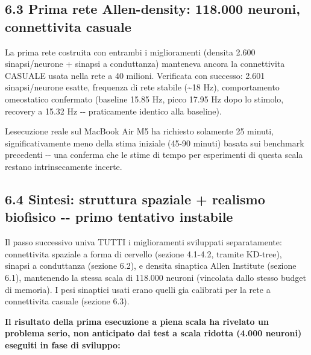 \documentclass[
  italian,
]{article}
\begin{document}
\subsection{6.3 Prima rete Allen-density: 118.000 neuroni, connettivita\textquotesingle{} casuale}\label{prima-rete-allen-density-118.000-neuroni-connettivita-casuale}

La prima rete costruita con entrambi i miglioramenti (densita\textquotesingle{} 2.600 sinapsi/neurone + sinapsi a conduttanza) manteneva ancora la connettivita\textquotesingle{} CASUALE usata nella rete a 40 milioni. Verificata con successo: 2.601 sinapsi/neurone esatte, frequenza di rete stabile (\textasciitilde18 Hz), comportamento omeostatico confermato (baseline 15.85 Hz, picco 17.95 Hz dopo lo stimolo, recovery a 15.32 Hz -\/- praticamente identico alla baseline).

L\textquotesingle esecuzione reale sul MacBook Air M5 ha richiesto solamente 25 minuti, significativamente meno della stima iniziale (45-90 minuti) basata sui benchmark precedenti -\/- una conferma che le stime di tempo per esperimenti di questa scala restano intrinsecamente incerte.

\subsection{6.4 Sintesi: struttura spaziale + realismo biofisico -\/- primo tentativo instabile}\label{sintesi-struttura-spaziale-realismo-biofisico----primo-tentativo-instabile}

Il passo successivo univa TUTTI i miglioramenti sviluppati separatamente: connettivita\textquotesingle{} spaziale a forma di cervello (sezione 4.1-4.2, tramite KD-tree), sinapsi a conduttanza (sezione 6.2), e densita\textquotesingle{} sinaptica Allen Institute (sezione 6.1), mantenendo la stessa scala di 118.000 neuroni (vincolata dallo stesso budget di memoria). I pesi sinaptici usati erano quelli gia\textquotesingle{} calibrati per la rete a connettivita\textquotesingle{} casuale (sezione 6.3).

\textbf{Il risultato della prima esecuzione a piena scala ha rivelato un problema serio, non anticipato dai test a scala ridotta (4.000 neuroni) eseguiti in fase di sviluppo:}
\end{document}
